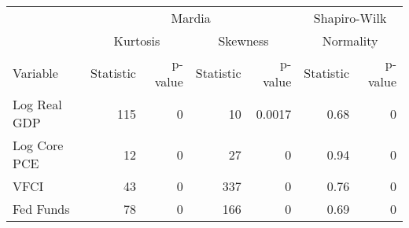 \begingroup
\fontsize{12.0pt}{14.4pt}\selectfont
\begin{tabular}{lrrrrrr}
\toprule
 & \multicolumn{4}{c}{Mardia} & \multicolumn{2}{c}{Shapiro-Wilk} \\ 
\cmidrule(lr){2-5} \cmidrule(lr){6-7}
 & \multicolumn{2}{c}{Kurtosis} & \multicolumn{2}{c}{Skewness} & \multicolumn{2}{c}{Normality} \\ 
\cmidrule(lr){2-3} \cmidrule(lr){4-5} \cmidrule(lr){6-7}
Variable & Statistic & p-value & Statistic & p-value & Statistic & p-value \\ 
\midrule\addlinespace[2.5pt]
Log Real GDP & 115 & 0 & 10 & 0.0017 & 0.68 & 0 \\ 
Log Core PCE & 12 & 0 & 27 & 0 & 0.94 & 0 \\ 
VFCI & 43 & 0 & 337 & 0 & 0.76 & 0 \\ 
Fed Funds & 78 & 0 & 166 & 0 & 0.69 & 0 \\ 
\bottomrule
\end{tabular}
\endgroup

